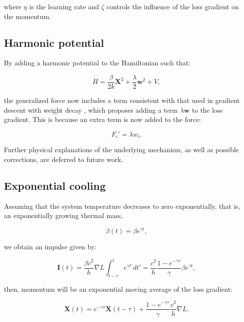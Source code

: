 \documentclass[12pt]{article}
\begin{document}
where $\eta$ is the learning rate and $\zeta$ controls the influence of the loss gradient on the momentum.

\subsection*{Harmonic potential}

By adding a harmonic potential to the Hamiltonian such that:

\begin{equation}
H = \frac{\beta}{2k} \mathbf{X}^2 + \frac{\lambda}{2} \mathbf{w}^2 + V,
\end{equation}

the generalized force now includes a term consistent with that used in gradient descent with weight decay \cite{krogh_weight_decay}, which proposes adding a term $\lambda \mathbf{w}$ to the loss gradient. This is because an extra term is now added to the force:

\begin{equation}
F_{i}' = \lambda w_{i}.
\end{equation}

Further physical explanations of the underlying mechanism, as well as possible corrections, are deferred to future work.

\subsection*{Exponential cooling}

Assuming that the system temperature decreases to zero exponentially, that is, an exponentially growing thermal mass, 

\begin{equation}
\beta(t) = \beta e^{\gamma t},
\end{equation}

we obtain an impulse given by:

\begin{equation}
\mathbf{I}(t) = \frac{\beta c^2}{h} \nabla L \int_{t-\tau}^t e^{\gamma t'} dt' = \frac{c^2}{h} \frac{1-e^{-\gamma \tau}}{\gamma} \beta e^{\gamma t},
\end{equation}

then, momentum will be an exponential moving average \cite{brown_expsmooth} of the loss gradient:

\begin{equation}
\mathbf{X}(t) = e^{-\gamma \tau} \mathbf{X}(t-\tau) + \frac{1-e^{-\gamma \tau}}{\gamma} \frac{c^2}{h} \nabla L.
\end{equation}
\end{document}
